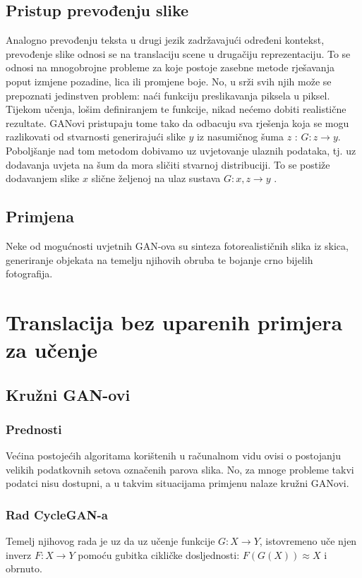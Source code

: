 \documentclass[lmodern, utf8, seminar]{fer}
\begin{document}
\section{Pristup prevođenju slike}
Analogno prevođenju teksta u drugi jezik zadržavajući određeni kontekst, prevođenje slike odnosi se na translaciju scene u drugačiju reprezentaciju. To se odnosi na mnogobrojne probleme za koje postoje zasebne metode rješavanja poput izmjene pozadine, lica ili promjene boje. No, u srži svih njih može se prepoznati jedinstven problem: naći funkciju preslikavanja piksela u piksel. Tijekom učenja, lošim definiranjem te funkcije, nikad nećemo dobiti realistične rezultate. GANovi pristupaju tome tako da odbacuju sva rješenja koja se mogu razlikovati od stvarnosti generirajući slike $y$ iz nasumičnog šuma $z$ : $G: z \rightarrow y$. Poboljšanje nad tom metodom dobivamo uz uvjetovanje ulaznih podataka, tj. uz dodavanja uvjeta na šum da mora sličiti stvarnoj distribuciji. To se postiže dodavanjem slike $x$ slične željenoj na ulaz sustava $G: {x,z} \rightarrow y$ \cite{isola2017image}.

\section{Primjena}
Neke od mogućnosti uvjetnih GAN-ova su sinteza fotorealističnih slika iz skica, generiranje objekata na temelju njihovih obruba te bojanje crno bijelih fotografija.



\chapter{Translacija bez uparenih primjera za učenje}
\section{Kružni GAN-ovi}

\subsection{Prednosti}
Većina postojećih algoritama korištenih u računalnom vidu ovisi o postojanju velikih podatkovnih setova označenih parova slika. No, za mnoge probleme takvi podatci nisu dostupni, a u takvim situacijama primjenu nalaze kružni GANovi.
\newline

\subsection{Rad CycleGAN-a}
Temelj njihovog rada je uz da uz učenje funkcije $G: X \rightarrow Y$, istovremeno uče njen inverz $F: X \rightarrow Y$ pomoću gubitka cikličke dosljednosti: $F(G(X)) \approx X$ i obrnuto.
\end{document}
